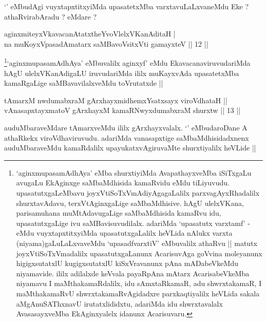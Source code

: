 \begin{artha}
`\stext' eMbudAgi vuyxtapxtitxyiMda upasatetxMba varxtavuLaLxvaneMdu Eke ? athaRvirabAradu ? eMdare ?
\end{artha}

\begin{shl}
aginxmiteyxVkavacanAtatxtheYvoVlelxVKanAditaH | \\
na muKoyxVpasadAmatarx saMBavoV\s sitxVti gamayxteV \hfill|| 12 || 
\end{shl}

\begin{artha}
\footnote{`aginxmupasamAdhAya' eMba shurxtiyiMda AvapathayxveMba iSiTxgaLu avugaLu EkAginxge saMbaMdhisida kamaRvidu eMdu tiLiyuvudu. upasatutxgaLeMbavu joyxVtiSoTxVmAdiyAgagaLalilx parxvagAyxRhadalilx shurxtavAdavu, terxVtAginxgaLige saMbaMdhisive. hAgU ulelxVKana, parisamuhana muMtAdavugaLige saMbaMdhisida kamaRvu idu, upasatutxgaLige ivu saMBavisuvudilalx. adariMda `upasatutx varxtamf' - eMdu vuyxtapxtitxyiMda upasatutxgaLalilx heVLida nAlukx varxta (niyama)gaLuLaLxvaveMdu `upasadfvarxtiV' eMbuvalilx athaRvu || matutx joyxVtiSoTxVmadalilx upasatutxgaLanunx AcarisuvAga goVvina moleyanunx higigxsutatxlU kugigxsutatxlU kiSxVravanunx pAna mADabeVkeMdu niyamavide. ililx adilalxde keVvala payaRpAna mAtarx AcarisabeVkeMba niyamavu I maMthakamaRdalilx, idu sAmxtaRkamaR, adu shwrxtakamaR, I maMthakamaRvU shwrxtakamaRvAgidadxre parxkaqtiyalilx heVLida sakala aMgAnuSAThxnavU irutatxlididxtu, adariMda idu shwrxtavalalx AvasasayxveMba EkAginxyalelx idanunx Acarisuvaru.}`aginxmupasamAdhAya' eMbuvalilx aginxyf' eMdu EkavacanaviruvudariMda hAgU ulelxVKanAdigaLU iruvudariMda ililx muKayxvAda upasatetxMba kamaRgaLige saMBavavilalxveMdu toVrutatxde ||
\end{artha}


\begin{shl}
tAmarxM nwdumabxraM gArxhayxmidhemxYsatxsayx viroVdhataH || \\
vAnasapxtayxmatoV gArxhayxM kamaRNwyxdumabxraM shurxtw \hfill|| 13 || 
\end{shl}

\begin{artha}
auduMbaraveMdare tAmarxveMdu ililx gArxhayxvalalx. `\stext' eMbudaroDane A athaRkekx viroVdhaviruvudu. adariMda vanasapxtige saMbaMdhisidadxnenx auduMbaraveMdu kamaRdalilx upayukatxvAgiruvaMte shurxtiyalilx heVLide ||
\end{artha}

